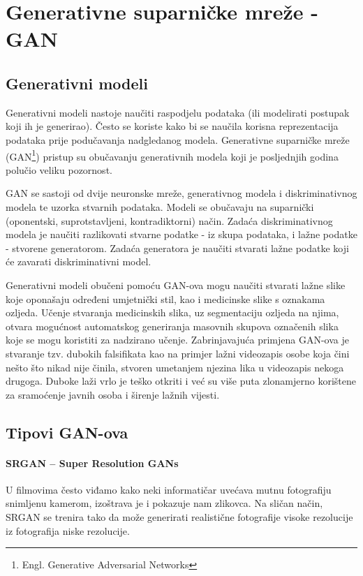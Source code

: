 \documentclass[times, utf8, diplomski]{fer}
\begin{document}
\chapter{Generativne suparničke mreže - GAN}
\section{Generativni modeli}
Generativni modeli nastoje naučiti raspodjelu podataka (ili modelirati postupak koji ih je generirao). Često se koriste kako bi se naučila korisna reprezentacija podataka prije podučavanja nadgledanog modela. Generativne suparničke mreže (GAN\footnote{Engl. Generative Adversarial Networks}) pristup su obučavanju generativnih modela koji je posljednjih godina polučio veliku pozornost. \cite{knjiga}

GAN se sastoji od dvije neuronske mreže, generativnog modela i diskriminativnog modela te uzorka stvarnih podataka. Modeli se obučavaju na suparnički (oponentski, suprotstavljeni, kontradiktorni) način. Zadaća diskriminativnog modela je naučiti razlikovati stvarne podatke - iz skupa podataka, i lažne podatke - stvorene generatorom. Zadaća generatora je naučiti stvarati lažne podatke koji će zavarati diskriminativni model. \cite{knjiga}

Generativni modeli obučeni pomoću GAN-ova mogu naučiti stvarati lažne slike koje oponašaju određeni umjetnički stil, kao i medicinske slike s oznakama ozljeda. Učenje stvaranja medicinskih slika, uz segmentaciju ozljeda na njima, otvara mogućnost automatskog generiranja masovnih skupova označenih slika koje se mogu koristiti za nadzirano učenje. Zabrinjavajuća primjena GAN-ova je stvaranje tzv. dubokih falsifikata  kao na primjer lažni videozapis osobe koja čini nešto što nikad nije činila, stvoren umetanjem njezina lika u videozapis nekoga drugoga. Duboke laži vrlo je teško otkriti i već su više puta zlonamjerno korištene za sramoćenje javnih osoba i širenje lažnih vijesti. \cite{knjiga}
\vfill

\section{Tipovi GAN-ova}
\subsubsection{SRGAN – Super Resolution GANs}
U filmovima često viđamo kako neki informatičar uvećava mutnu fotografiju snimljenu kamerom, izoštrava je i pokazuje nam zlikovca. Na sličan način, SRGAN se trenira tako da može generirati realistične fotografije visoke rezolucije iz fotografija niske rezolucije. \cite{Tipovi}
\end{document}
